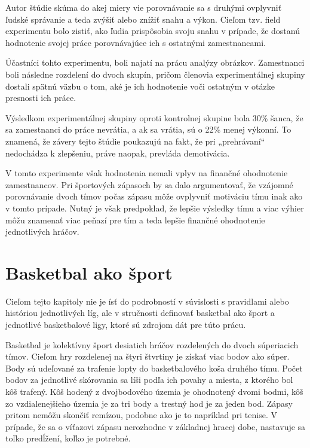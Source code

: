 \documentclass[
  digital, %
  twoside, %
  notable,   %
  lof,     %
  lot,     %
]{fithesis3}
\begin{document}
		Autor štúdie skúma do akej miery vie porovnávanie sa s druhými ovplyvniť ľudské správanie a teda zvýšiť alebo znížiť snahu a výkon. Cieľom tzv. field experimentu bolo zistiť, ako ľudia prispôsobia svoju snahu v prípade, že dostanú hodnotenie svojej práce porovnávajúce ich s ostatnými zamestnancami. 
		
		Účastníci tohto experimentu, boli najatí na prácu analýzy obrázkov. Zamestnanci boli následne rozdelení do dvoch skupín, pričom členovia experimentálnej skupiny dostali spätnú väzbu o tom, aké je ich hodnotenie voči ostatným v otázke presnosti ich práce. 
		
		Výsledkom experimentálnej skupiny oproti kontrolnej skupine bola 30\% šanca, že sa zamestnanci do práce nevrátia, a ak sa vrátia, sú o 22\% menej výkonní. To znamená, že závery tejto štúdie poukazujú na fakt, že pri „prehrávaní“ nedochádza k zlepšeniu, práve naopak, prevláda demotivácia. \parencite[s.~4]{barankay2010}
		
		V tomto experimente však hodnotenia nemali vplyv na finančné ohodnotenie zamestnancov. Pri športových zápasoch by sa dalo argumentovať, že vzájomné porovnávanie dvoch tímov počas zápasu môže ovplyvniť motiváciu tímu inak ako v tomto prípade. Nutný je však predpoklad, že lepšie výsledky tímu a viac výhier môžu znamenať viac peňazí pre tím a teda lepšie finančné ohodnotenie jednotlivých hráčov.
				
	\chapter{Basketbal ako šport}
	Cieľom tejto kapitoly nie je ísť do podrobností v súvislosti s pravidlami alebo históriou jednotlivých líg, ale v stručnosti definovať basketbal ako šport a jednotlivé basketbalové ligy, ktoré sú zdrojom dát pre túto prácu.
	
	Basketbal je kolektívny šport desiatich hráčov rozdelených do dvoch súperiacich tímov. Cieľom hry rozdelenej na štyri štvrtiny je získať viac bodov ako súper. Body sú udeľované za trafenie lopty do basketbalového koša druhého tímu. Počet bodov za jednotlivé skórovania sa líši podľa ich povahy a miesta, z ktorého bol kôš trafený. Kôš hodený z dvojbodového územia je ohodnotený dvomi bodmi, kôš zo vzdialenejšieho územia je za tri body a trestný hod je za jeden bod. Zápasy pritom nemôžu skončiť remízou, podobne ako je to napríklad pri tenise. V prípade, že sa o víťazovi zápasu nerozhodne v základnej hracej dobe, nastavuje sa toľko predĺžení, koľko je potrebné.
	
\end{document}
